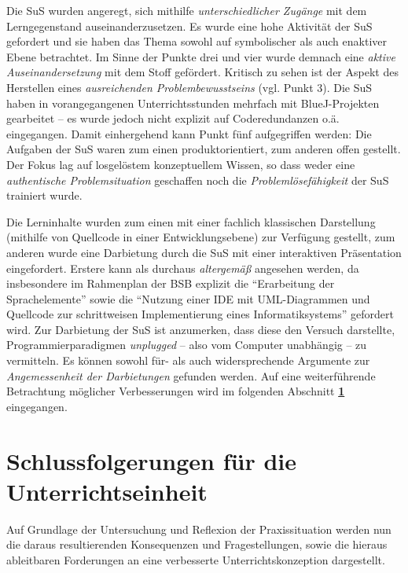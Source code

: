 \documentclass[paper=a4, DIV=13, BCOR=12mm, twoside=on, onecolumn=on, open = any, titlepage =on, parskip =half-, headsepline = on, footsepline = on, chapterprefix = on, sectionprefix = on, appendixprefix = off, fontsize = 12pt, numbers = noenddot, abstract = off]{scrreprt}
\begin{document}
Die SuS wurden angeregt, sich mithilfe \emph{unterschiedlicher Zugänge} mit dem Lerngegenstand auseinanderzusetzen. Es wurde eine hohe Aktivität der SuS gefordert und sie haben das Thema sowohl auf symbolischer als auch enaktiver Ebene betrachtet. Im Sinne der Punkte drei und vier wurde demnach eine \emph{aktive Auseinandersetzung} mit dem Stoff gefördert. Kritisch zu sehen ist der Aspekt des Herstellen eines \emph{ausreichenden Problembewusstseins} (vgl. Punkt 3). Die SuS haben in vorangegangenen Unterrichtsstunden mehrfach mit BlueJ-Projekten gearbeitet -- es wurde jedoch nicht explizit auf Coderedundanzen o.ä. eingegangen. Damit einhergehend kann Punkt fünf aufgegriffen werden: Die Aufgaben der SuS waren zum einen produktorientiert, zum anderen offen gestellt. Der Fokus lag auf losgelöstem konzeptuellem Wissen, so dass weder eine \emph{authentische Problemsituation} geschaffen noch die \emph{Problemlösefähigkeit} der SuS trainiert wurde.

Die Lerninhalte wurden zum einen mit einer fachlich klassischen Darstellung (mithilfe von Quellcode in einer Entwicklungsebene) zur Verfügung gestellt, zum anderen wurde eine Darbietung durch die SuS mit einer interaktiven Präsentation eingefordert. Erstere kann als durchaus \emph{altergemäß} angesehen werden, da insbesondere im Rahmenplan der BSB explizit die "`Erarbeitung der Sprachelemente"' sowie die "`Nutzung einer IDE mit UML-Diagrammen und Quellcode zur schrittweisen Implementierung eines Informatiksystems"' \cite[S.17]{oberstufe:09} gefordert wird. Zur Darbietung der SuS ist anzumerken, dass diese den Versuch darstellte, Programmierparadigmen \emph{unplugged} -- also vom Computer unabhängig -- zu vermitteln. Es können sowohl für- als auch widersprechende Argumente zur \emph{Angemessenheit der Darbietungen} gefunden werden. Auf eine weiterführende Betrachtung möglicher Verbesserungen wird im folgenden Abschnitt \textbf{\ref{schlussfolgerungen}} eingegangen.

\par \singlespacing
\chapter{Schlussfolgerungen für die Unterrichtseinheit}
\label{schlussfolgerungen}
\onehalfspacing
\vspace*{-1cm}
Auf Grundlage der Untersuchung und Reflexion der Praxissituation werden nun die daraus resultierenden Konsequenzen und Fragestellungen, sowie die hieraus ableitbaren Forderungen an eine verbesserte Unterrichtskonzeption dargestellt.
\end{document}
